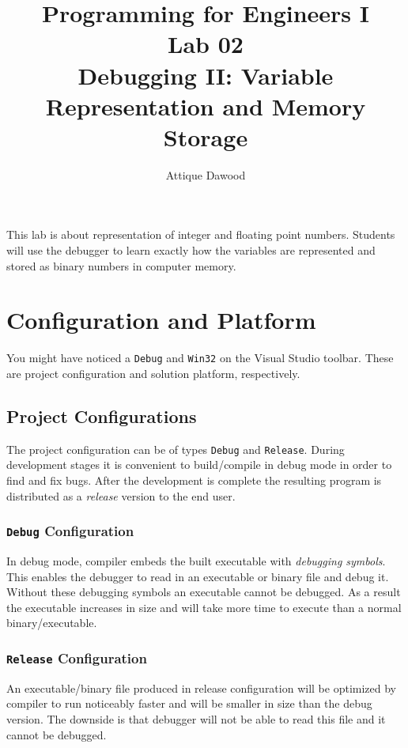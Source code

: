 \documentclass{article}
\title{\vspace{-2cm}Programming for Engineers I\\Lab 02\\Debugging II: Variable Representation and Memory Storage}
\author{Attique Dawood}
\begin{document}
\maketitle

This lab is about representation of integer and floating point numbers. Students will use the debugger to learn exactly how the variables are represented and stored as binary numbers in computer memory\footnotemark.


\section{Configuration and Platform}
You might have noticed a \verb|Debug| and \verb|Win32| on the Visual Studio toolbar. These are project configuration and solution platform, respectively.
\subsection{Project Configurations}
The project configuration can be of types \verb|Debug| and \verb|Release|. During development stages it is convenient to build/compile in debug mode in order to find and fix bugs. After the development is complete the resulting program is distributed as a \emph{release} version to the end user.
\subsubsection{\texttt{Debug} Configuration}
In debug mode, compiler embeds the built executable with \emph{debugging symbols}. This enables the debugger to read in an executable or binary file and debug it. Without these debugging symbols an executable cannot be debugged. As a result the executable increases in size and will take more time to execute than a normal binary/executable.
\subsubsection{\texttt{Release} Configuration}
An executable/binary file produced in release configuration will be optimized by compiler to run noticeably faster and will be smaller in size than the debug version. The downside is that debugger will not be able to read this file and it cannot be debugged.
\end{document}

